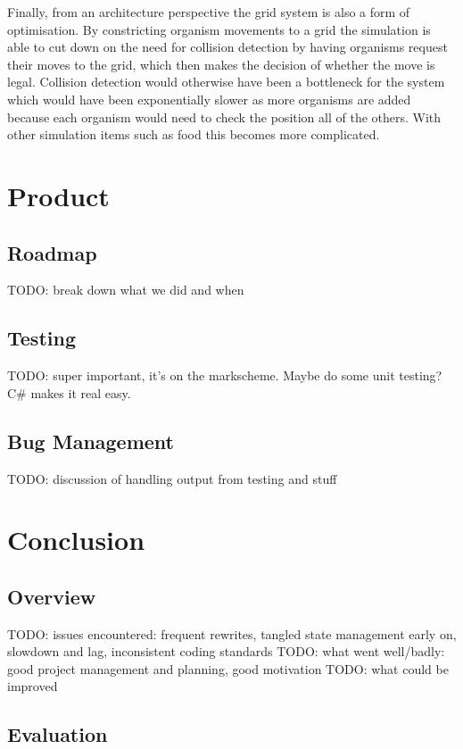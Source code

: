 \documentclass{ueacmpstyle}
\begin{document}
Finally, from an architecture perspective the grid system is also a form of optimisation. By constricting organism movements to a grid the simulation is able to cut down on the need for collision detection by having organisms request their moves to the grid, which then makes the decision of whether the move is legal. Collision detection would otherwise have been a bottleneck for the system which would have been exponentially slower as more organisms are added because each organism would need to check the position all of the others. With other simulation items such as food this becomes more complicated.

\section{Product}

\subsection{Roadmap}

TODO: break down what we did and when

\subsection{Testing}

TODO: super important, it's on the markscheme. Maybe do some unit testing? C\# makes it real easy.

\subsection{Bug Management}

TODO: discussion of handling output from testing and stuff

\section{Conclusion}

\subsection{Overview}

TODO: issues encountered: frequent rewrites, tangled state management early on, slowdown and lag, inconsistent coding standards
TODO: what went well/badly: good project management and planning, good motivation
TODO: what could be improved

\subsection{Evaluation}
\end{document}
